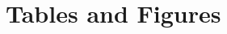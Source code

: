 \documentclass[12pt,a4paper]{article}
\begin{document}








\newpage
\section*{Tables and Figures}






% 
%
\end{document}
